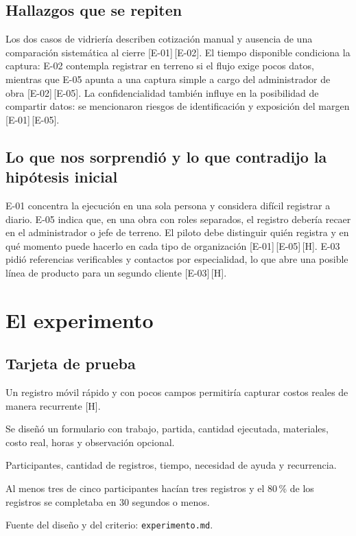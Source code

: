 \documentclass[11pt]{article}
\newcommand{\ev}[1]{\textcolor{prblue}{[#1]}}
\newcommand{\hip}{\textcolor{prorange}{[H]}}
\begin{document}
\subsection{Hallazgos que se repiten}
Los dos casos de vidriería describen cotización manual y ausencia de una
comparación sistemática al cierre \ev{E-01}\,\ev{E-02}. El tiempo
disponible condiciona la captura: E-02 contempla registrar en terreno si
el flujo exige pocos datos, mientras que E-05 apunta a una captura simple
a cargo del administrador de obra \ev{E-02}\,\ev{E-05}. La
confidencialidad también influye en la posibilidad de compartir datos:
se mencionaron riesgos de identificación y exposición del margen
\ev{E-01}\,\ev{E-05}.

\subsection{Lo que nos sorprendió y lo que contradijo la hipótesis inicial}
E-01 concentra la ejecución en una sola persona y considera difícil
registrar a diario. E-05 indica que, en una obra con roles separados,
el registro debería recaer en el administrador o jefe de terreno. El
piloto debe distinguir quién registra y en qué momento puede hacerlo
en cada tipo de organización \ev{E-01}\,\ev{E-05}\,\hip. E-03 pidió
referencias verificables y contactos por especialidad, lo que abre una
posible línea de producto para un segundo cliente \ev{E-03}\,\hip.

\section{El experimento}

\subsection{Tarjeta de prueba}
\begin{description}[leftmargin=!,labelwidth=4cm]
  \item[Creíamos que] Un registro móvil rápido y con pocos campos
  permitiría capturar costos reales de manera recurrente \hip.
  \item[Para verificarlo] Se diseñó un formulario con trabajo, partida,
  cantidad ejecutada, materiales, costo real, horas y observación opcional.
  \item[Mediremos] Participantes, cantidad de registros, tiempo,
  necesidad de ayuda y recurrencia.
  \item[Teníamos razón si] Al menos tres de cinco participantes hacían
  tres registros y el 80\,\% de los registros se completaba en
  30 segundos o menos.
\end{description}
Fuente del diseño y del criterio: \texttt{experimento.md}.
\end{document}
